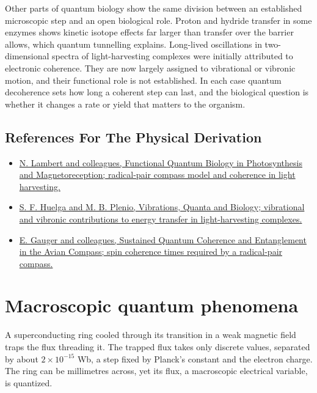 \documentclass[11pt,oneside]{book}
\begin{document}
Other parts of quantum biology show the same division between an established microscopic step and an open biological role. Proton and hydride transfer in some enzymes shows kinetic isotope effects far larger than transfer over the barrier allows, which quantum tunnelling explains. Long-lived oscillations in two-dimensional spectra of light-harvesting complexes were initially attributed to electronic coherence. They are now largely assigned to vibrational or vibronic motion, and their functional role is not established. In each case quantum decoherence sets how long a coherent step can last, and the biological question is whether it changes a rate or yield that matters to the organism.

\subsection*{References For The Physical Derivation}
\begin{itemize}
\item \href{https://arxiv.org/abs/1205.0883}{N. Lambert and colleagues, Functional Quantum Biology in Photosynthesis and Magnetoreception; radical-pair compass model and coherence in light harvesting.}
\item \href{https://arxiv.org/abs/1307.3530}{S. F. Huelga and M. B. Plenio, Vibrations, Quanta and Biology; vibrational and vibronic contributions to energy transfer in light-harvesting complexes.}
\item \href{https://arxiv.org/abs/0906.3725}{E. Gauger and colleagues, Sustained Quantum Coherence and Entanglement in the Avian Compass; spin coherence times required by a radical-pair compass.}
\end{itemize}





\clearpage

\section{Macroscopic quantum phenomena}

\label{topic:macroscopic-quantum-phenomena}

A superconducting ring cooled through its transition in a weak magnetic field traps the flux threading it. The trapped flux takes only discrete values, separated by about \(2\times10^{-15}\) Wb, a step fixed by Planck's constant and the electron charge. The ring can be millimetres across, yet its flux, a macroscopic electrical variable, is quantized.
\end{document}
